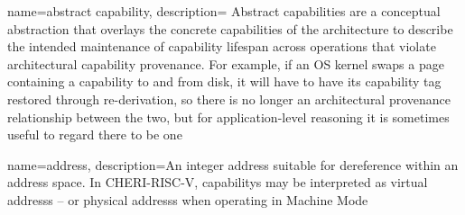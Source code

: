 {
  name=abstract capability,
  description={
    Abstract capabilities are a conceptual abstraction that overlays the
    concrete capabilities of the architecture to describe the intended
    maintenance of capability lifespan across operations that violate
    architectural \gls{capability provenance}.
    For example, if an OS kernel
    swaps a page containing a capability to and from disk, 
    it will have to have its \gls{capability tag}
    restored through re-derivation, so there is no longer an
    architectural provenance relationship between the two, but for
    application-level reasoning it is sometimes useful to regard there
    to be one}
}

{
  name=address,
  description={An integer address suitable for dereference within an address
    space.
    In \gls{CHERI-RISC-V}, \glspl{capability} may be interpreted as
    \glspl{virtual address} -- or \glspl{physical address} when operating in
    Machine Mode}
}

